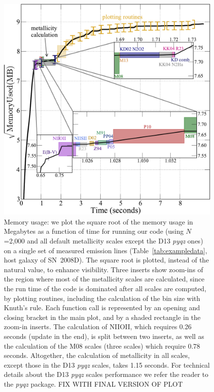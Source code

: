 \documentclass{emulateapj}
\begin{document}
\begin{figure}[ht!]
  \includegraphics[width=1.0\columnwidth]{memusage.pdf}
   \caption{Memory usage: we plot the square root of the memory usage in Megabytes as a function of time for running our code (using $N$=2,000 and all default metallicity scales except the D13 \emph{pyqz} ones) on a single set of measured emission lines (Table~\ref{tab:exampledata}, host galaxy of SN~2008D). The square root is plotted, instead of the natural value, to enhance visibility.  
Three inserts show zoom-ins of the region where most of the metallicity scales are calculated, since the run time of the code is dominated after all scales are computed, by plotting routines, including the calculation of the bin size with Knuth's rule. 
Each function call is represented by an opening and closing bracket in the main plot, and by a shaded rectangle in the zoom-in inserts.%
The calculation of NIIOII, which requires 0.26 seconds (update in the end), is split between two inserts, as well as the calculation of the M08 scales (three scales) which require 0.78 seconds. Altogether, the calculation of metallicity in all scales, except those in the D13 \emph{pyqz} scales, takes 1.15 seconds. For technical details about the D13 \emph{pyqz} scales performance we refer the reader to the \emph{pyqz} package. FIX WITH FINAL VERSION OF PLOT}
 \label{fig:mem}
\end{figure}
\end{document}
